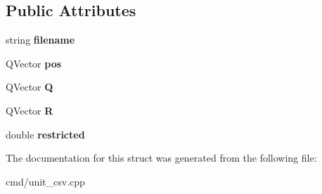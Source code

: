 \subsection*{Public Attributes}
\begin{DoxyCompactItemize}
\item 
string {\bfseries filename}\hypertarget{structSubUnitStruct_aad4b5edf09d31d428577f2cd6f212694}{}\label{structSubUnitStruct_aad4b5edf09d31d428577f2cd6f212694}

\item 
Q\+Vector {\bfseries pos}\hypertarget{structSubUnitStruct_a870567c569c2b199a93f4bfe35eb3fc0}{}\label{structSubUnitStruct_a870567c569c2b199a93f4bfe35eb3fc0}

\item 
Q\+Vector {\bfseries Q}\hypertarget{structSubUnitStruct_a1c53fba61bacb15b5fcca28d6b92b078}{}\label{structSubUnitStruct_a1c53fba61bacb15b5fcca28d6b92b078}

\item 
Q\+Vector {\bfseries R}\hypertarget{structSubUnitStruct_a1085792964dbe3acfbb5958049770415}{}\label{structSubUnitStruct_a1085792964dbe3acfbb5958049770415}

\item 
double {\bfseries restricted}\hypertarget{structSubUnitStruct_ada8122e1b4d68d80d1e61e4e4b8c4276}{}\label{structSubUnitStruct_ada8122e1b4d68d80d1e61e4e4b8c4276}

\end{DoxyCompactItemize}


The documentation for this struct was generated from the following file\+:\begin{DoxyCompactItemize}
\item 
cmd/unit\+\_\+csv.\+cpp\end{DoxyCompactItemize}

